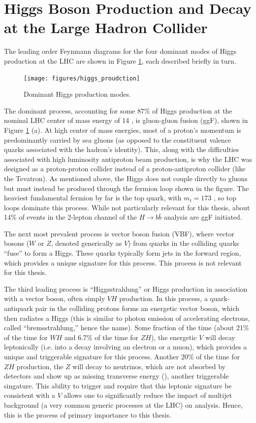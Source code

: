\section{Higgs Boson Production and Decay at the Large Hadron Collider}
The leading order Feynmann diagrams for the four dominant modes of Higgs production at the LHC are shown in Figure \ref{fig:hprod}, each described briefly in turn.
\begin{figure}[!htbp]\captionsetup{justification=centering}
  \centering
  \texttt{[image: figures/higgs\_proudction]}
  \caption{Dominant Higgs production modes.}
  \label{fig:hprod}
\end{figure}
The dominant process, accounting for some 87\% of Higgs production at the nominal LHC center of mass energy of 14 \tev, is gluon-gluon fusion (ggF), shown in Figure \ref{fig:hprod} (a).  At high center of mass energies, most of a proton's momentum is predominantly carried by sea gluons (as opposed to the constituent valence quarks associated with the hadron's identity).  This, along with the difficulties associated with high luminosity antiproton beam production, is why the LHC was designed as a proton-proton collider instead of a proton-antiproton collider (like the Tevatron).  As mentioned above, the Higgs does not couple directly to gluons but must instead be produced through the fermion loop shown in the figure.  The heaviest fundamental fermion by far is the top quark, with $m_t=173$ \gev, so top loops dominate this process.  While not particularly relevant for this thesis, about 14\% of events in the 2-lepton channel of the $H\to b\bar{b}$ analysis are ggF initiated.

The next most prevalent process is vector boson fusion (VBF), where vector bosons ($W$ or $Z$, denoted generically as $V$) from quarks in the colliding quarks ``fuse'' to form a Higgs.  These quarks typically form jets in the forward region, which provides a unique signature for this process.  This process is not relevant for this thesis.

The third leading process is ``Higgsstrahlung'' or Higgs production in association with a vector boson, often simply $VH$ production.  In this process, a quark-antiquark pair in the colliding protons forms an energetic vector boson, which then radiates a Higgs (this is similar to photon emission of accelerating electrons, called ``bremsstrahlung,'' hence the name).  Some fraction of the time (about 21\% of the time for $WH$ and 6.7\% of the time for $ZH$), the energetic $V$ will decay leptonically (i.e. into a decay involving an electron or a muon), which provides a unique and triggerable signature for this process.  Another 20\% of the time for $ZH$ production, the $Z$ will decay to neutrinos, which are not absorbed by detectors and show up as missing transverse energy (\met), another triggerable singature.  This ability to trigger and require that this leptonic signature be consistent with a $V$ allows one to significantly reduce the impact of multijet background (a very common generic processes at the LHC) on analysis.  Hence, this is the process of primary importance to this thesis.


